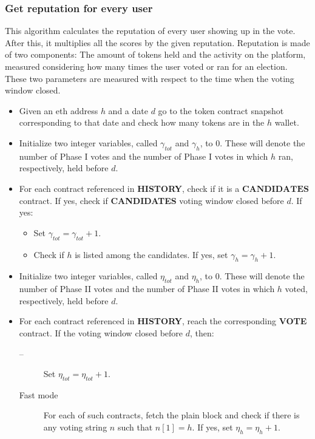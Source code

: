 \documentclass[submission, copyright,creativecommons,sharealike,noncommercial]{eptcs}
\newcommand{\Candidates}{\textbf{CANDIDATES}\xspace}
\newcommand{\Vote}{\textbf{VOTE}\xspace}
\newcommand{\History}{\textbf{HISTORY}\xspace}
\begin{document}
\subsubsection{Get reputation for every user}\label{subsubsec:Get reputation for every user}
	This algorithm calculates the reputation of every user showing up in the vote. After this, it multiplies all the scores by the given reputation. Reputation is made of two components: The amount of tokens held and the activity on the platform, measured considering how many times the user voted or ran for an election. These two parameters are measured with respect to the time when the voting window closed.
	\begin{itemize}
		\item Given an eth address $h$ and a date $d$ go to the token contract snapshot corresponding to that date and check how many tokens are in the $h$ wallet.
		
		\item Initialize two integer variables, called $\gamma_{tot}$ and $\gamma_{h}$, to $0$. These will denote the number of Phase I votes and the number of Phase I votes in which $h$ ran, respectively, held before $d$.

		\item For each contract referenced in \History, check if it is a $\Candidates$ contract. If yes, check if \Candidates voting window closed before $d$. If yes:
		 \begin{itemize}
		 	\item Set $\gamma_{tot} = \gamma_{tot}+1$.
		 	\item Check if $h$ is listed among the candidates. If yes, set  $\gamma_{h} = \gamma_{h}+1$.
		 \end{itemize}
	
		\item Initialize two integer variables, called $\eta_{tot}$ and $\eta_{h}$, to $0$. These will denote the number of Phase II votes and the number of Phase II votes in which $h$ voted, respectively, held before $d$.
	
		\item For each contract referenced in \History, reach the corresponding \Vote contract. If the voting window closed before $d$, then: 
		\begin{description}
			\item[--] Set $\eta_{tot} = \eta_{tot}+1$.
	
			\item[Fast mode] For each of such contracts, fetch the plain block and check if there is any voting string $n$ such that $n[1]=h$. If yes, set $\eta_{h} = \eta_{h}+1$.
			

\end{description}
\end{itemize}
\end{document}
